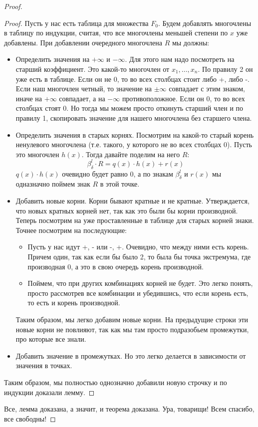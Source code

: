 \begin{proof}
    \begin{proof}
        Пусть у нас есть таблица для множества $F_0$.
        Будем добавлять многочлены в таблицу по индукции, считая, что все многочлены меньшей степени по $x$ уже добавлены. 
        При добавлении очередного многочлена $R$ мы должны: \begin{itemize}
            \item Определить значения на $+\infty$ и $-\infty$. Для этого нам надо посмотреть на старший коэффициент. Это какой-то многочлен от $x_1, \dots, x_n$. По правилу 2 он уже есть в таблице. Если он не 0, то во всех столбцах стоит либо +, либо -. Если наш многочлен четный, то значение на $\pm \infty$ совпадает с этим знаком, иначе на $+ \infty$ совпадает, а на $-\infty$ противоположное. Если он 0, то во всех столбцах стоят 0. Но тогда мы можем просто откинуть старший член и по правилу 1, скопировать значение для нашего многочлена без старшего члена.
            \item Определить значения в старых корнях. Посмотрим на какой-то старый корень ненулевого многочлена (т.е. такого, у которого не во всех столбцах 0). Пусть это многочлен $h(x)$. Тогда давайте поделим на него $R$: \[ \beta_{\delta}^l \cdot R = q(x)\cdot h(x) + r(x)  \]
            $q(x) \cdot h(x)$ очевидно будет равно 0, а по знакам $\beta_{\delta}^l$ и $r(x)$ мы одназначно поймем знак $R$ в этой точке.
            \item Добавить новые корни. Корни бывают кратные и не кратные. Утверждается, что новых кратных корней нет, так как это были бы корни производной. Теперь посмотрим на уже проставленные в таблице для старых корней знаки. Точнее посмотрим на последующие: \begin{itemize}
                \item Пусть у нас идут +, - или -, +. Очевидно, что между ними есть корень. Причем один, так как если бы было 2, то была бы точка экстремума, где производная 0, а это в свою очередь корень производной. 
                \item Поймем, что при других комбинациях корней не будет. Это легко понять, просто рассмотрев все комбинации и убедившись, что если корень есть, то есть и корень производной.
            \end{itemize}
            Таким образом, мы легко добавим новые корни. На предыдущие строки эти новые корни не повлияют, так как мы там просто подразобьем промежутки, про которые все знали.
            \item Добавить значение в промежутках. Но это легко делается в зависимости от значения в точках.
        \end{itemize}
        Таким образом, мы полностью однозначно добавили новую строчку и по индукции доказали лемму.
    \end{proof}
    Все, лемма доказана, а значит, и теорема доказана.
    Ура, товарищи! Всем спасибо, все свободны!
\end{proof}